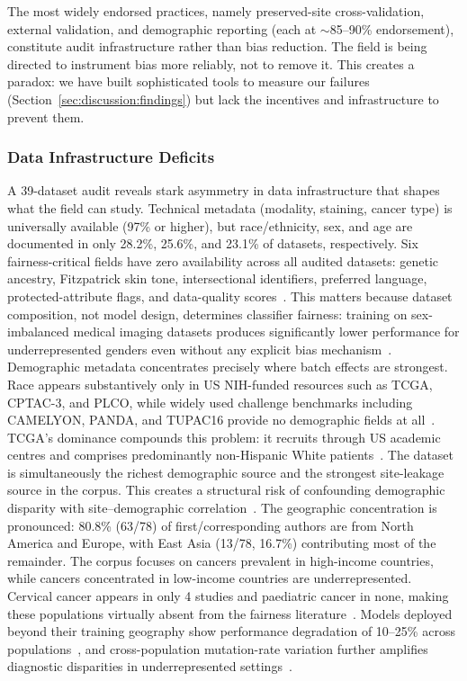 The most widely endorsed practices, namely preserved-site cross-validation, external validation, and demographic reporting (each at $\sim$85--90\% endorsement), constitute audit infrastructure rather than bias reduction. The field is being directed to instrument bias more reliably, not to remove it. This creates a paradox: we have built sophisticated tools to measure our failures (Section~\ref{sec:discussion:findings}) but lack the incentives and infrastructure to prevent them.

\subsubsection{Data Infrastructure Deficits}
\label{sec:discussion:data}
A 39-dataset audit reveals stark asymmetry in data infrastructure that shapes what the field can study. Technical metadata (modality, staining, cancer type) is universally available (97\% or higher), but race/ethnicity, sex, and age are documented in only 28.2\%, 25.6\%, and 23.1\% of datasets, respectively. Six fairness-critical fields have zero availability across all audited datasets: genetic ancestry, Fitzpatrick skin tone, intersectional identifiers, preferred language, protected-attribute flags, and data-quality scores~\citep{norori2021addressing, celi2022sources, vaidya2024demographic}. This matters because dataset composition, not model design, determines classifier fairness: training on sex-imbalanced medical imaging datasets produces significantly lower performance for underrepresented genders even without any explicit bias mechanism~\citep{larrazabal2020gender}. Demographic metadata concentrates precisely where batch effects are strongest. Race appears substantively only in US NIH-funded resources such as TCGA, CPTAC-3, and PLCO, while widely used challenge benchmarks including CAMELYON, PANDA, and TUPAC16 provide no demographic fields at all~\citep{komen2024batch}. TCGA's dominance compounds this problem: it recruits through US academic centres and comprises predominantly non-Hispanic White patients~\citep{wang2018tcga}. The dataset is simultaneously the richest demographic source and the strongest site-leakage source in the corpus. This creates a structural risk of confounding demographic disparity with site--demographic correlation~\citep{howard2021site, vaidya2024demographic, celi2022sources}. The geographic concentration is pronounced: 80.8\% (63/78) of first/corresponding authors are from North America and Europe, with East Asia (13/78, 16.7\%) contributing most of the remainder. The corpus focuses on cancers prevalent in high-income countries, while cancers concentrated in low-income countries are underrepresented. Cervical cancer appears in only 4 studies and paediatric cancer in none, making these populations virtually absent from the fairness literature~\citep{celi2022sources, musa2026cross, ceccon2025underrepresentation}. Models deployed beyond their training geography show performance degradation of 10--25\% across populations~\citep{musa2026cross}, and cross-population mutation-rate variation further amplifies diagnostic disparities in underrepresented settings~\citep{polin2025mutation}.

